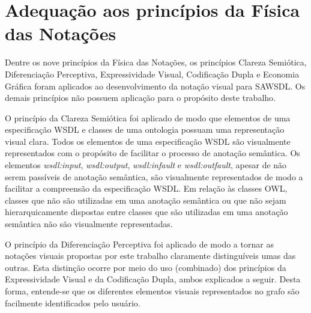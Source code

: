 \section{Adequação aos princípios da Física das Notações}\label{3-adequacao-aos-principios-da-fisica-das-notacoes}

Dentre os nove princípios da Física das Notações, os princípios Clareza Semiótica, Diferenciação Perceptiva, Expressividade Visual, Codificação Dupla e Economia Gráfica foram aplicados ao desenvolvimento da notação visual para SAWSDL. Os demais princípios não possuem aplicação para o propósito deste trabalho.


O princípio da Clareza Semiótica foi aplicado de modo que elementos de uma especificação WSDL e classes de uma ontologia possuam uma representação visual clara. Todos os elementos de uma especificação WSDL são visualmente representados com o propósito de facilitar o processo de anotação semântica. Os elementos \textit{wsdl:input}, \textit{wsdl:output}, \textit{wsdl:infault} e \textit{wsdl:outfault}, apesar de não serem passíveis de anotação semântica, são visualmente representados de modo a facilitar a compreensão da especificação WSDL. Em relação às classes OWL, classes que não são utilizadas em uma anotação semântica ou que não sejam hierarquicamente dispostas entre classes que são utilizadas em uma anotação semântica não são visualmente representadas.


O princípio da Diferenciação Perceptiva foi aplicado de modo a tornar as notações visuais propostas por este trabalho claramente distinguíveis umas das outras. Esta distinção ocorre por meio do uso (combinado) dos princípios da Expressividade Visual e da Codificação Dupla, ambos explicados a seguir. Desta forma, entende-se que os diferentes elementos visuais representados no grafo são facilmente identificados pelo usuário.


